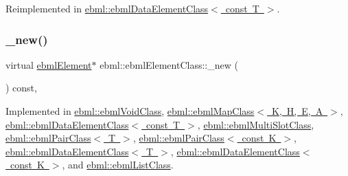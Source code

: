 Reimplemented in \mbox{\hyperlink{classebml_1_1ebmlDataElementClass_3_01const_01T_01_4_a73cd60993aad76a5123f0f6c56b506dc}{ebml\+::ebml\+Data\+Element\+Class$<$ const T $>$}}.

\mbox{\label{classebml_1_1ebmlElementClass_a223ede6b8bc3c85251d2d73f0256fb45}} 
\subsubsection{\texorpdfstring{\+\_\+new()}{\_new()}}
{\footnotesize\ttfamily virtual \mbox{\hyperlink{classebml_1_1ebmlElement}{ebml\+Element}}$\ast$ ebml\+::ebml\+Element\+Class\+::\+\_\+new (\begin{DoxyParamCaption}{ }\end{DoxyParamCaption}) const\hspace{0.3cm}{\ttfamily [protected]}, {}}



Implemented in \mbox{\hyperlink{classebml_1_1ebmlVoidClass_a8852efa478e785ae70b4fce60f67e6f7}{ebml\+::ebml\+Void\+Class}}, \mbox{\hyperlink{classebml_1_1ebmlMapClass_a3370b9b3457982693c08723af7d5130a}{ebml\+::ebml\+Map\+Class$<$ K, H, E, A $>$}}, \mbox{\hyperlink{classebml_1_1ebmlDataElementClass_3_01const_01T_01_4_ac0f96ad77925a1236e1a637db0d5a356}{ebml\+::ebml\+Data\+Element\+Class$<$ const T $>$}}, \mbox{\hyperlink{classebml_1_1ebmlMultiSlotClass_a51b5c0c3c0aa3c2e54e63f536413b5a5}{ebml\+::ebml\+Multi\+Slot\+Class}}, \mbox{\hyperlink{classebml_1_1ebmlPairClass_abb748027028719a4a1682c089ac21226}{ebml\+::ebml\+Pair\+Class$<$ T $>$}}, \mbox{\hyperlink{classebml_1_1ebmlPairClass_abb748027028719a4a1682c089ac21226}{ebml\+::ebml\+Pair\+Class$<$ const K $>$}}, \mbox{\hyperlink{classebml_1_1ebmlDataElementClass_a022ddc37a9bf678de66dab9157d08b9a}{ebml\+::ebml\+Data\+Element\+Class$<$ T $>$}}, \mbox{\hyperlink{classebml_1_1ebmlDataElementClass_a022ddc37a9bf678de66dab9157d08b9a}{ebml\+::ebml\+Data\+Element\+Class$<$ const K $>$}}, and \mbox{\hyperlink{classebml_1_1ebmlListClass_aef729ee70f218de1013c3782c481bffb}{ebml\+::ebml\+List\+Class}}.

\mbox{\label{classebml_1_1ebmlElementClass_ad44d7844db705e5e1d8c35a780b58486}} 
